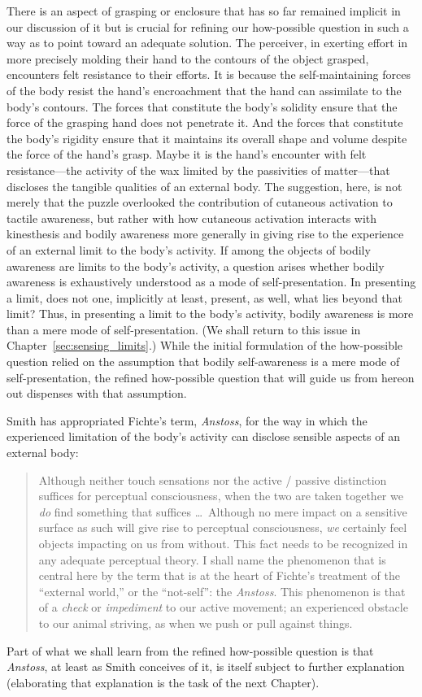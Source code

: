 There is an aspect of grasping or enclosure that has so far remained implicit in our discussion of it but is crucial for refining our how-possible question in such a way as to point toward an adequate solution. The perceiver, in exerting effort in more precisely molding their hand to the contours of the object grasped, encounters felt resistance to their efforts. It is because the self-maintaining forces of the body resist the hand's encroachment that the hand can assimilate to the body's contours. The forces that constitute the body's solidity ensure that the force of the grasping hand does not penetrate it. And the forces that constitute the body's rigidity ensure that it maintains its overall shape and volume despite the force of the hand's grasp. Maybe it is the hand's encounter with felt resistance---the activity of the wax limited by the passivities of matter---that discloses the tangible qualities of an external body. The suggestion, here, is not merely that the puzzle overlooked the contribution of cutaneous activation to tactile awareness, but rather with how cutaneous activation interacts with kinesthesis and bodily awareness more generally in giving rise to the experience of an external limit to the body's activity. If among the objects of bodily awareness are limits to the body's activity, a question arises whether bodily awareness is exhaustively understood as a mode of self-presentation. In presenting a limit, does not one, implicitly at least, present, as well, what lies beyond that limit? Thus, in presenting a limit to the body's activity, bodily awareness is more than a mere mode of self-presentation. (We shall return to this issue in Chapter~\ref{sec:sensing_limits}.) While the initial formulation of the how-possible question relied on the assumption that bodily self-awareness is a mere mode of self-presentation, the refined how-possible question that will guide us from hereon out dispenses with that assumption.

Smith has appropriated Fichte's term, \emph{Anstoss}, for the way in which the experienced limitation of the body's activity can disclose sensible aspects of an external body:
\begin{quote}
	Although neither touch sensations nor the active / passive distinction suffices for perceptual consciousness, when the two are taken together we \emph{do} find something that suffices \ldots\ Although no mere impact on a sensitive surface as such will give rise to perceptual consciousness, \emph{we} certainly feel objects impacting on us from without. This fact needs to be recognized in any adequate perceptual theory. I shall name the phenomenon that is central here by the term that is at the heart of Fichte's treatment of the ``external world,'' or the ``not-self'': the \emph{Anstoss}. This phenomenon is that of a \emph{check} or \emph{impediment} to our active movement; an experienced obstacle to our animal striving, as when we push or pull against things. \citep[153]{Smith:2002sa} 
\end{quote}
Part of what we shall learn from the refined how-possible question is that \emph{Anstoss}, at least as Smith conceives of it, is itself subject to further explanation (elaborating that explanation is the task of the next Chapter). 

